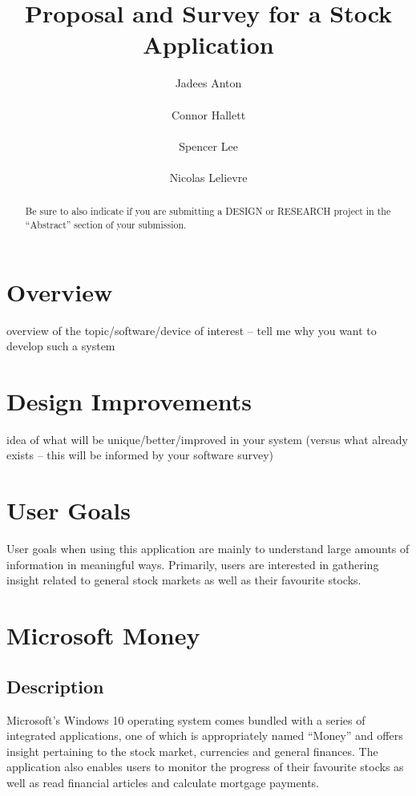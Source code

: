 \documentclass{sigchi}
\begin{document}
\title{Proposal and Survey for a Stock Application}
\author{
	\alignauthor Jadees Anton\\
		\\
	\alignauthor Connor Hallett\\
		\\
	\alignauthor Spencer Lee\\
		\\
	\alignauthor Nicolas Lelievre\\
}

\maketitle

\begin{abstract}
Be sure to also indicate if you are submitting a DESIGN or RESEARCH project in the ``Abstract'' section of
your submission.
\end{abstract}


\section{Overview}
overview of the topic/software/device of interest – tell me why you want to develop such a system

\section{Design Improvements}
idea of what will be unique/better/improved in your system (versus what already exists – this will be
informed by your software survey)

\section{User Goals}
User goals when using this application are mainly to understand large amounts of information in meaningful ways. Primarily, users are interested in gathering insight related to general stock markets as well as their favourite stocks.



\section{Microsoft Money}
\subsection{Description}
Microsoft's Windows 10 operating system comes bundled with a series of integrated applications, one of which is appropriately named ``Money'' and offers insight pertaining to the stock market, currencies and general finances. The application also enables users to monitor the progress of their favourite stocks as well as read financial articles and calculate mortgage payments.
\end{document}

